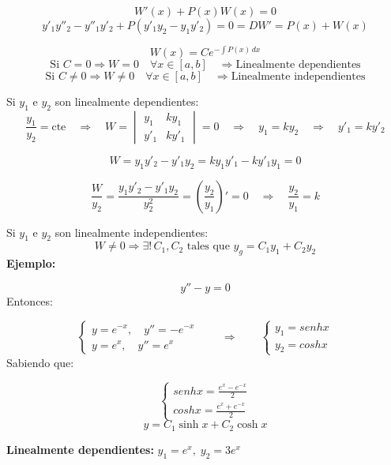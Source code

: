 \documentclass[a4paper,12pt]{article}
\begin{document}
\[
W'(x) + P(x)W(x) = 0
\]
\newpage
\[
y'_1 y''_2 - y''_1 y'_2 + P(y'_1 y_2 - y_1 y'_2) = 0 = DW' = P(x) + W(x)
\]

\[
W(x) = C e^{-\int P(x)\,dx}
\]
\vspace{-0,5 em}
\[
\text{Si } C = 0 \Longrightarrow W = 0 \quad \forall x \in [a,b] 
\quad \Rightarrow \text{Linealmente dependientes}
\]
\vspace{-0,3 em}
\[
\text{Si } C \neq 0 \Longrightarrow W \neq 0 \quad \forall x \in [a,b] 
\quad \Rightarrow \text{Linealmente independientes}
\]

\medskip
\noindent
Si \( y_1 \) e \( y_2 \) son linealmente dependientes:
\vspace{-0,1 em}
\[
\frac{y_1}{y_2} = \text{cte} \quad \Rightarrow \quad W = 
\begin{vmatrix}
y_1 & k y_1 \\
y'_1 & k y'_1
\end{vmatrix}
= 0 
\quad \Rightarrow \quad y_1 = k y_2 \quad \Rightarrow \quad y'_1 = k y'_2
\]

\[
W = y_1 y'_2 - y'_1 y_2 = k y_1 y'_1 - k y'_1 y_1 = 0
\]

\[
\frac{W}{y_2} = \frac{y_1 y'_2 - y'_1 y_2}{y_2^2} 
= \left(\frac{y_2}{y_1}\right)' = 0 
\quad \Longrightarrow \quad \frac{y_2}{y_1} = k
\]

\medskip
\noindent
Si \( y_1 \) e \( y_2 \) son linealmente independientes:
\[
W \neq 0 
\Longrightarrow \exists! \, C_1, C_2 \text{ tales que } 
y_g = C_1 y_1 + C_2 y_2
\]
\textbf{Ejemplo:}

\[
y'' - y = 0
\]
Entonces:

\[
\begin{cases}
y = e^{-x}, \quad y'' = -e^{-x} \\
y = e^{x}, \quad y'' = e^{x}
\end{cases}
\qquad \Rightarrow \qquad
\begin{cases}
y_1 = senh x \\
y_2 = cosh x
\end{cases}
\]
Sabiendo que:

\[
\begin{cases}
senh x = \frac{e^x - e^{-x}}{2} \\
cosh x = \frac{e^x + e^{-x}}{2}
\end{cases}
\]
\vspace{1 em}
\[
y = C_1 \sinh x + C_2 \cosh x
\]

\newpage
\noindent
\textbf{Linealmente dependientes:} \quad \( y_1 = e^x, \; y_2 = 3e^x \)
\end{document}
